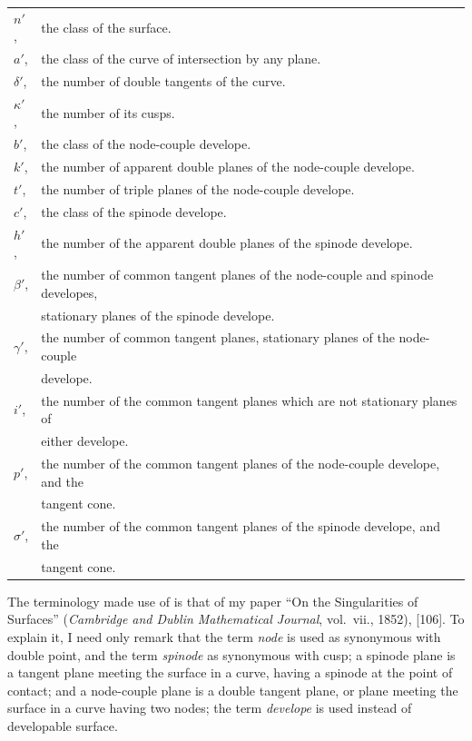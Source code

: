 \documentclass[11pt,a4paper]{book}
\begin{document}
\begin{tabular}{@{}ll@{}}
$n'$, & the class of the surface. \\
$a'$, & the class of the curve of intersection by any plane. \\
$\delta'$, & the number of double tangents of the curve. \\
$\kappa'$, & the number of its cusps. \\
$b'$, & the class of the node-couple develope. \\
$k'$, & the number of apparent double planes of the node-couple develope. \\
$t'$, & the number of triple planes of the node-couple develope. \\
$c'$, & the class of the spinode develope. \\
$h'$, & the number of the apparent double planes of the spinode develope. \\
$\beta'$, & the number of common tangent planes of the node-couple and spinode developes, \\
 & \quad stationary planes of the spinode develope. \\
$\gamma'$, & the number of common tangent planes, stationary planes of the node-couple \\
 & \quad develope. \\
$i'$, & the number of the common tangent planes which are not stationary planes of \\
 & \quad either develope. \\
$p'$, & the number of the common tangent planes of the node-couple develope, and the \\
 & \quad tangent cone. \\
$\sigma'$, & the number of the common tangent planes of the spinode develope, and the \\
 & \quad tangent cone. \\
\end{tabular}

The terminology made use of is that of my paper ``On the Singularities of Surfaces'' (\textit{Cambridge and Dublin Mathematical Journal}, vol.~vii., 1852), [106]. To explain it, I need only remark that the term \textit{node} is used as synonymous with double point, and the term \textit{spinode} as synonymous with cusp; a spinode plane is a tangent plane meeting the surface in a curve, having a spinode at the point of contact; and a node-couple plane is a double tangent plane, or plane meeting the surface in a curve having two nodes; the term \textit{develope} is used instead of developable surface.
\end{document}

